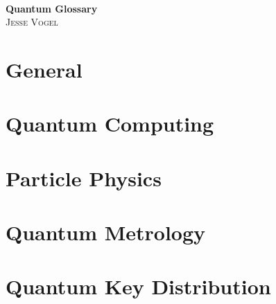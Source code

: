 \documentclass[10pt]{report}
\begin{document}
\thispagestyle{empty}

\begin{center}
    \; \\ \vspace{4cm} \textbf{\Huge Quantum Glossary}
    \\ \vspace{2cm}
    \textsc{Jesse Vogel}
\end{center}

\newpage

{
    \tableofcontents
}

\newcommand{\cat}{}

\chapter{General}
\renewcommand{\cat}{GEN}


\chapter{Quantum Computing}
\renewcommand{\cat}{COM}




\chapter{Particle Physics}
\renewcommand{\cat}{PAR}


\chapter{Quantum Metrology}
\renewcommand{\cat}{MET}


\chapter{Quantum Key Distribution}
\renewcommand{\cat}{MET}

\end{document}
